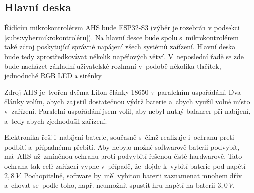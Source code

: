 
\newpage
\subsection{Hlavní deska}

Řídícím mikrokontrolérem AHS bude ESP32-S3 (výběr je rozebrán v podsekci \ref{subs:vybermikrokontroléru}).
Na hlavní desce bude spolu s~mikrokontrolérem také zdroj poskytující správné napájení všech systémů zařízení.
Hlavní deska bude tedy zprostředkovávat několik napěťových větví.
V~neposlední řadě se zde bude nacházet základní uživatelské rozhraní v~podobě několika tlačítek, jednoduché RGB LED a sirénky.

Zdroj AHS je~tvořen dvěma LiIon články 18650 v~paralelním uspořádání.
Dva články volím, abych zajistil dostatečnou výdrž baterie a~abych využil volné místo v~zařízení.
Paralelní uspořádání jsem volil, aby nebyl nutný balancer při nabíjení, a~tedy abych zjednodušil zařízení.

Elektronika řeší i~nabíjení baterie, současně s~čímž realizuje i~ochranu proti podbití a~případnému přebití.
Aby nebylo možné softwarově baterii podvybít, má~AHS už~zmíněnou ochranu proti podvybití řešenou čistě hardwarově.
Tato ochrana tak celé zařízení vypne v~případě, že~dojde k~vybití baterie pod napětí \(2,8~V\).
Pochopitelně, software by~měl vybitou baterii zaznamenat mnohem dřív a~chovat se~podle toho, např. neumožnit spustit hru napětí na baterii \(3,0~V\).


